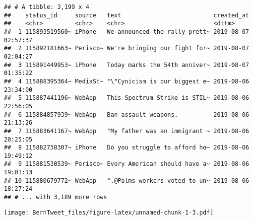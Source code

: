 \documentclass[]{article}
\newenvironment{Shaded}{\begin{snugshade}}{\end{snugshade}}
\newcommand{\CommentTok}[1]{\textcolor[rgb]{0.56,0.35,0.01}{\textit{#1}}}
\newcommand{\DataTypeTok}[1]{\textcolor[rgb]{0.13,0.29,0.53}{#1}}
\newcommand{\KeywordTok}[1]{\textcolor[rgb]{0.13,0.29,0.53}{\textbf{#1}}}
\newcommand{\NormalTok}[1]{#1}
\newcommand{\OperatorTok}[1]{\textcolor[rgb]{0.81,0.36,0.00}{\textbf{#1}}}
\newcommand{\StringTok}[1]{\textcolor[rgb]{0.31,0.60,0.02}{#1}}
\begin{document}
\begin{verbatim}
## # A tibble: 3,199 x 4
##    status_id     source   text                          created_at         
##    <chr>         <chr>    <chr>                         <dttm>             
##  1 115893519560~ iPhone   We announced the rally prett~ 2019-08-07 02:57:37
##  2 115892181663~ Perisco~ We're bringing our fight for~ 2019-08-07 02:04:27
##  3 115891449953~ iPhone   Today marks the 54th anniver~ 2019-08-07 01:35:22
##  4 115888395364~ MediaSt~ "\"Cynicism is our biggest e~ 2019-08-06 23:34:00
##  5 115887441196~ WebApp   This Spectrum Strike is STIL~ 2019-08-06 22:56:05
##  6 115884857939~ WebApp   Ban assault weapons.          2019-08-06 21:13:26
##  7 115883641167~ WebApp   "My father was an immigrant ~ 2019-08-06 20:25:05
##  8 115882738307~ iPhone   Do you struggle to afford ho~ 2019-08-06 19:49:12
##  9 115881530539~ Perisco~ Every American should have a~ 2019-08-06 19:01:13
## 10 115880679772~ WebApp   ".@Palms workers voted to un~ 2019-08-06 18:27:24
## # ... with 3,189 more rows
\end{verbatim}

\begin{Shaded}
\end{Shaded}

\texttt{[image: BernTweet\_files/figure-latex/unnamed-chunk-1-3.pdf]}
\end{document}

